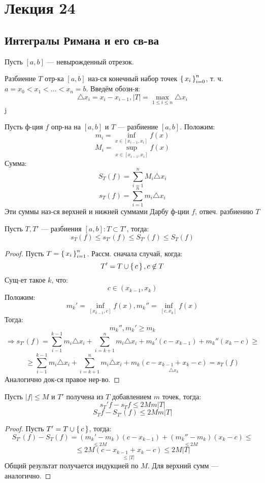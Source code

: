 \section{Лекция 24}
\subsection{Интегралы Римана и его св-ва}
Пусть $[a, b]$ --- невырожденный отрезок.
\begin{definition}
Разбиение $T$ отр-ка $[a, b]$ наз-ся конечный набор точек $\set{x_i}_{i = 0}^{n}$, т. ч. $a = x_0 < x_1 < \ldots < x_{n} = b$. Введём обозн-я:
\[
\triangle x_i = x_i - x_{i - 1}, \left|T\right| = \underset{1 \leq i \leq n}{\max} \triangle x_i
\]j
\end{definition}
Пусть ф-ция $f$ опр-на на $[a, b]$ и $T$ --- разбиение $[a, b]$. Положим:
\[
m_i = \underset{x \in [x_{i - 1}, x_{i}]}{\inf} f(x)
\]
\[
M_i = \underset{x \in [x_{i - 1}, x_i]}{\sup} f(x)
\]
Сумма:
\[
S_{T}(f) = \sum_{i = 1}^{n} M_i \triangle x_i
\]
\[
s_{T}(f) = \sum_{i = 1}^{n} m_i \triangle x_i
\]
Эти суммы наз-ся верхней и нижней суммами Дарбу ф-ции $f$, отвеч. разбиению $T$
\begin{lemma}
  \label{lm:1}
  Пусть $T, T'$ --- разбиения $[a, b] \colon T \subset T'$, тогда:
  \[
  s_{T}(f) \leq s_{T'}(f) \leq S_{T'}(f) \leq S_{T}(f)
  \]
\end{lemma}
\begin{proof}
Пусть $T = \set{x_i}_{i = 1}^{n}$. Рассм. сначала случай, когда:
\[
T' = T \cup \set{c}, c \not\in T
\]
Сущ-ет такое $k$, что:
\[
c \in (x_{k - 1}, x_k)
\]
Положим:
\[
m_k' = \underset{[x_{k - 1}, c]}{\inf} f(x), m_k'' = \underset{[c, x_k]}{\inf} f(x)
\]
Тогда:
\[
m_k'', m_k' \geq m_k 
\]
\[
\Rightarrow s_{T'}(f) = \sum_{i - 1}^{k - 1} m_{i}\triangle x_i + \sum_{i = k + 1}^{n} m_i \triangle x_i + m_k' (c - x_{k - 1}) + m_k'' (x_k - c) \geq 
\]
\[
 \geq \sum_{i - 1}^{k - 1} m_{i}\triangle x_i + \sum_{i = k + 1}^{n} m_i \triangle x_i + m_k\underset{\triangle x_k}{(c - x_{k - 1} + x_k - c)} =  s_{T}(f)
\]
Аналогично док-ся правое нер-во.
\end{proof}
\begin{lemma}
\label{lm:1'}
Пусть $\left|f\right| \leq M$ и $T'$ получена из $T$ добавлением $m$ точек, тогда:
\[
s_T'{f} - s_T{f} \leq 2Mm\left|T\right|
\]
\[
S_T{f} - S_{T'}(f) \leq 2Mm\left|T\right|
\]
\end{lemma}
\begin{proof}
Пусть $T' = T \cup \set{c}$, тогда:
\[
S_{T'}(f) - S_{T}(f) = \underset{\leq 2M}{(m_k' - m_k)}(c - x_{k - 1}) + \underset{\leq 2M}{(m_k'' - m_k)}(x_k - c) \leq 
\]
\[
 \leq 2M\underset{\leq \left|T\right|}{(c - x_{k - 1} + x_k - c)} \leq 2M\left|T\right|
\]
Общий результат получается индукцией по $M$. Для верхний сумм --- аналогично.
\end{proof}
